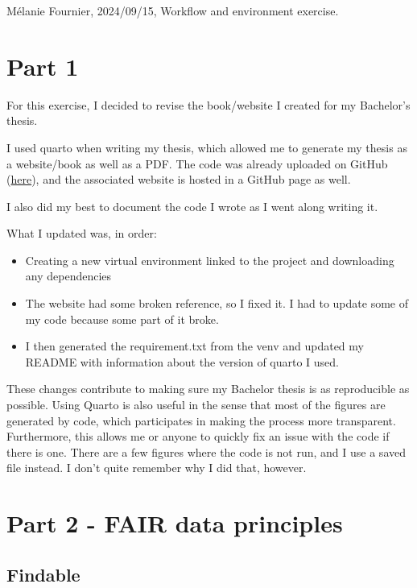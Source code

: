 \documentclass{article}
\begin{document}
Mélanie Fournier, 2024/09/15, Workflow and environment exercise.

\section*{Part 1}

For this exercise, I decided to revise the book/website I created for my Bachelor's thesis. 

I used quarto when writing my thesis, which allowed me to generate my thesis as a website/book as well as a PDF. The code was already uploaded on GitHub (\href{https://github.com/MelanieInky/ThesisBook/tree/master}{here}), and the associated website is hosted in a GitHub page as well. 

I also did my best to document the code I wrote as I went along writing it. 

What I updated was, in order:

\begin{itemize}
    \item Creating a new virtual environment linked to the project and downloading any dependencies
    \item The website had some broken reference, so I fixed it. I had to update some of my code because some part of it broke.
    \item I then generated the requirement.txt from the venv and updated my README with information about the version of quarto I used.    
\end{itemize}

These changes contribute to making sure my Bachelor thesis is as reproducible as possible. Using Quarto is also useful in the sense that most of the figures are generated by code, which participates in making the process more transparent. Furthermore, this allows me or anyone to quickly fix an issue with the code if there is one. There are a few figures where the code is not run, and I use a saved file instead. I don't quite remember why I did that, however.



\section*{Part 2 - FAIR data principles}


\subsection*{Findable}
\end{document}
